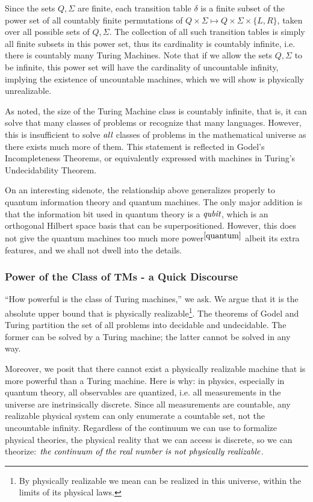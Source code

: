 \documentclass[12pt]{article}  %
\begin{document}
Since the sets $Q, \Sigma$ are finite, each transition table $\delta$ is a finite subset of the power set of all countably finite permutations of $Q \times \Sigma \mapsto Q \times \Sigma \times \{L, R\}$, taken over all possible sets of $Q, \Sigma$. The collection of all such transition tables is simply all finite subsets in this power set, thus its cardinality is countably infinite, i.e. there is countably many Turing Machines. Note that if we allow the sets $Q, \Sigma$ to be infinite, this power set will have the cardinality of uncountable infinity, implying the existence of uncountable machines, which we will show is physically unrealizable.

As noted, the size of the Turing Machine class is countably infinite, that is, it can solve that many classes of problems or recognize that many languages. However, this is insufficient to solve $\emph{all}$ classes of problems in the mathematical universe as there exists much more of them. This statement is reflected in Godel's Incompleteness Theorems, or equivalently expressed with machines in Turing's Undecidability Theorem.

On an interesting sidenote, the relationship above generalizes properly to quantum information theory and quantum machines. The only major addition is that the information bit used in quantum theory is a $\emph{qubit}$, which is an orthogonal Hilbert space basis that can be superpositioned. However, this does not give the quantum machines too much more power$^{\ref{quantum}}$ albeit its extra features, and we shall not dwell into the details.





\subsubsection{Power of the Class of TMs - a Quick Discourse}
``How powerful is the class of Turing machines,'' we ask. We argue that it is the absolute upper bound that is physically realizable\footnote{By physically realizable we mean can be realized in this universe, within the limits of its physical laws.}. The theorems of Godel and Turing partition the set of all problems into decidable and undecidable. The former can be solved by a Turing machine; the latter cannot be solved in any way.

Moreover, we posit that there cannot exist a physically realizable machine that is more powerful than a Turing machine. Here is why: in physics, especially in quantum theory, all observables are quantized, i.e. all measurements in the universe are instrinsically discrete. Since all measurements are countable, any realizable physical system can only enumerate a countable set, not the uncountable infinity. Regardless of the continuum we can use to formalize physical theories, the physical reality that we can access is discrete, so we can theorize: $\emph{the continuum of the real number is not physically realizable}$.
\end{document}
